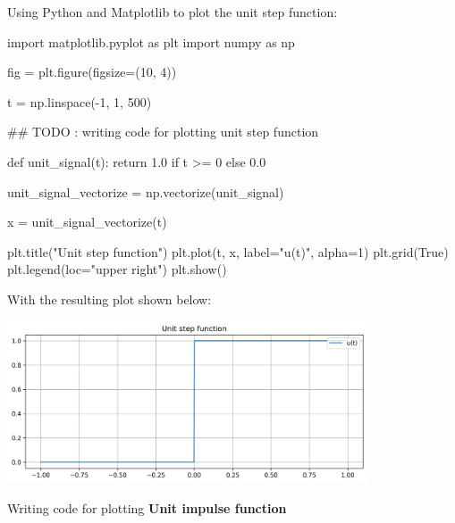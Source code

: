 \documentclass[a4paper, 10pt]{article}
\begin{document}
\begin{solution}
Using Python and Matplotlib to plot the unit step function:
\begin{codingbox}
import matplotlib.pyplot as plt
import numpy as np

fig = plt.figure(figsize=(10, 4))

t = np.linspace(-1, 1, 500)

## TODO : writing code for plotting unit step function

def unit_signal(t):
    return 1.0 if t >= 0 else 0.0

unit_signal_vectorize = np.vectorize(unit_signal)

x = unit_signal_vectorize(t)

plt.title("Unit step function")
plt.plot(t, x, label="u(t)", alpha=1)
plt.grid(True)
plt.legend(loc="upper right")
plt.show()
\end{codingbox}

With the resulting plot shown below:
\begin{center}
    \includegraphics[width=0.8\textwidth]{images/problem_7_1.png}
\end{center}
\end{solution}

\newpage

\begin{subproblems}[start=2]
    \item Writing code for plotting \textbf{Unit impulse function}
\end{subproblems}
\end{document}
